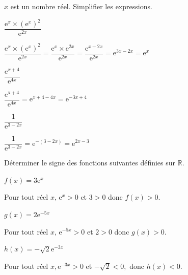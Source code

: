\documentclass[11pt,a4paper]{article}  %
\begin{document}

$x$ est un nombre réel. Simplifier les expressions.
\begin{enumMet}
	\item $\dfrac{\mathrm{e}^x \times\left(\mathrm{e}^x\right)^2}{\mathrm{e}^{2 x}}$
	\begin{corrBox}
		$\dfrac{\mathrm{e}^{x} \times\left(\mathrm{e}^{x}\right)^{2}}{\mathrm{e}^{2 x}}=\dfrac{\mathrm{e}^{x} \times \mathrm{e}^{2 x}}{\mathrm{e}^{2 x}}=\dfrac{\mathrm{e}^{x+2 x}}{\mathrm{e}^{2 x}}=\mathrm{e}^{3 x-2 x}=\mathrm{e}^{x}$		
	\end{corrBox}
	\item $\dfrac{\mathrm{e}^{x+4}}{\mathrm{e}^{4 x}}$
	\begin{corrBox}
		$\dfrac{\mathrm{e}^{\mathrm{x}+4}}{\mathrm{e}^{4 x}}=\mathrm{e}^{x+4-4 x}=\mathrm{e}^{-3 x+4}$		
	\end{corrBox}
	\item $\dfrac{1}{\mathrm{e}^{3-2 x}}$
	\begin{corrBox}
		$\dfrac{1}{\mathrm{e}^{3-2 x}}=\mathrm{e}^{-(3-2 x)}=\mathrm{e}^{2 x-3}$
	\end{corrBox}
\end{enumMet}



Déterminer le signe des fonctions suivantes définies sur $\mathbb{R}$.
\begin{enumMet}
	\item $f(x)=3 \mathrm{e}^x$
	\begin{corrBox}
		Pour tout réel $x$, $\mathrm{e}^{x}>0$ et $3>0$ donc $f(x)>0$.		
	\end{corrBox}
	\item $g(x)=2 \mathrm{e}^{-5 x}$
	\begin{corrBox}
		Pour tout réel $x$, $\mathrm{e}^{-5 x}>0$ et $2>0$ donc $g(x)>0$.		
	\end{corrBox}
	\item $h(x)=-\sqrt{2} \mathrm{e}^{-3 x}$
	\begin{corrBox}
		Pour tout réel $x, \mathrm{e}^{-3 x}>0$ et $-\sqrt{2}<0,$ donc $h(x)<0$.		
	\end{corrBox}
\end{enumMet}

\end{document}
